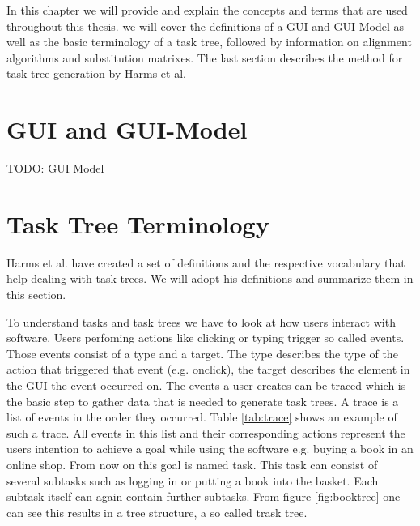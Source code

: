In this chapter we will provide and explain the concepts and terms that are used throughout this thesis. 
we will cover the definitions of a GUI and GUI-Model as well as the basic terminology of a task tree, followed by 
 information on alignment algorithms and substitution matrixes.
The last section describes the method for task tree generation by Harms et al.\cite{harms2013}


\section{GUI and GUI-Model}
\label{sec:foundationguiandguimodel}

TODO: GUI Model

\section{Task Tree Terminology}
\label{sec:foundationtasktreeterminology}
Harms et al.\cite{harms2013} have created a set of definitions and the respective vocabulary that help dealing with task trees.
We will adopt his definitions and summarize them in this section.

To understand tasks and task trees we have to look at how users interact with software. 
Users perfoming actions like clicking or typing trigger so called events. Those events consist of a type and a target. 
The type describes the type of the action that triggered that event (e.g. onclick), the target describes the element in the GUI the event occurred on.
The events a user creates can be traced which is the basic step to gather data that is needed to generate task trees. 
A trace is a list of events in the order they occurred. Table \ref{tab:trace} shows an example of such a trace. 
All events in this list and their corresponding actions represent the users intention to achieve a goal while using the software e.g. buying a book 
in an online shop. From now on this goal is named task. This task can consist of several subtasks such as logging in or putting a book into the basket.
Each subtask itself can again contain further subtasks. From figure \ref{fig:booktree} one can see this results in a tree structure, a so called trask tree.

